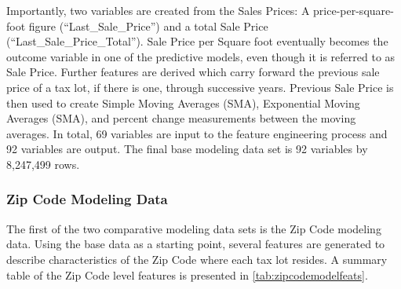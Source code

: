 \documentclass[12pt,]{article}
\begin{document}
Importantly, two variables are created from the Sales Prices: A
price-per-square-foot figure (``Last\_Sale\_Price'') and a total Sale
Price (``Last\_Sale\_Price\_Total''). Sale Price per Square foot
eventually becomes the outcome variable in one of the predictive models,
even though it is referred to as Sale Price. Further features are
derived which carry forward the previous sale price of a tax lot, if
there is one, through successive years. Previous Sale Price is then used
to create Simple Moving Averages (SMA), Exponential Moving Averages
(SMA), and percent change measurements between the moving averages. In
total, 69 variables are input to the feature engineering process and 92
variables are output. The final base modeling data set is 92 variables
by 8,247,499 rows.

\hypertarget{zip-code-modeling-data}{%
\subsubsection{Zip Code Modeling Data}\label{zip-code-modeling-data}}

The first of the two comparative modeling data sets is the Zip Code
modeling data. Using the base data as a starting point, several features
are generated to describe characteristics of the Zip Code where each tax
lot resides. A summary table of the Zip Code level features is presented
in \ref{tab:zipcodemodelfeats}.
\end{document}
